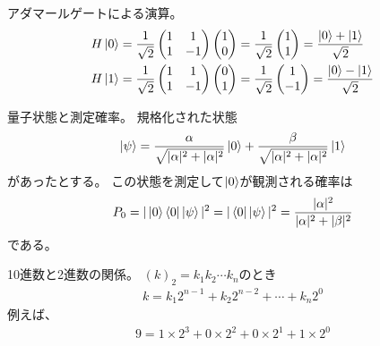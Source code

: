 \documentclass[]{ltjsarticle}
\begin{document}
アダマールゲートによる演算。
\begin{align}
    H \ket{0}
    &=
    \frac{1}{\sqrt{2}}
    \begin{pmatrix}
        1 & 1 \\
        1 & -1
    \end{pmatrix}
    \begin{pmatrix}
        1 \\ 0
    \end{pmatrix}
    =
    \frac{1}{\sqrt{2}}
    \begin{pmatrix}
        1 \\ 1
    \end{pmatrix}
    =
    \frac{\ket{0} + \ket{1}}{\sqrt{2}} \\
    H \ket{1}
    &=
    \frac{1}{\sqrt{2}}
    \begin{pmatrix}
        1 & 1 \\
        1 & -1
    \end{pmatrix}
    \begin{pmatrix}
        0 \\ 1
    \end{pmatrix}
    =
    \frac{1}{\sqrt{2}}
    \begin{pmatrix}
        1 \\ -1
    \end{pmatrix}
    =
    \frac{\ket{0} - \ket{1}}{\sqrt{2}}
\end{align}

量子状態と測定確率。
規格化された状態
\begin{align}
    \ket{\psi} 
    =
    \frac{\alpha}{\sqrt{|\alpha|^2+|\alpha|^2}} 
    \ket{0}   
    +
    \frac{\beta}{\sqrt{|\alpha|^2+|\alpha|^2}} 
    \ket{1}   
\end{align}
があったとする。
この状態を測定して$\ket{0}$が観測される確率は
\begin{align}
    P_0
    =
    |\ket{0}\bra{0}\ket{\psi}|^2
    =
    |\bra{0}\ket{\psi}|^2
    =
    \frac{|\alpha|^2}{|\alpha|^2 + |\beta|^2}
\end{align}
である。


10進数と2進数の関係。
$(k)_2 = k_1 k_2 \cdots k_n$のとき
\begin{align}
    k 
    = 
    k_1 2^{n-1}
    +
    k_2 2^{n-2}
    +
    \cdots
    +
    k_n 2^0
\end{align}
例えば、
\begin{align}
    9 
    = 
    1 \times 2^{3}
    +
    0 \times 2^{2}
    +
    0 \times 2^{1}
    +
    1 \times 2^0
\end{align}
\end{document}
